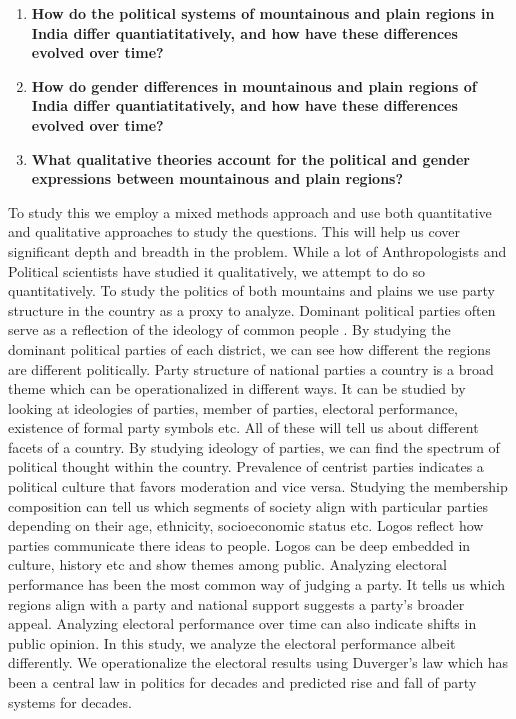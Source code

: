 \begin{sloppypar}
\begin{enumerate}
    \item \textbf{How do the political systems of mountainous and plain regions in India differ quantiatitatively, and how have these differences evolved over time? }
    \item \textbf{How do gender differences in mountainous and plain regions of India differ quantiatitatively, and how have these differences evolved over time?}
    \item \textbf{What qualitative theories account for the political and gender expressions between mountainous and plain regions?}
\end{enumerate}

To study this we employ a mixed methods approach and use both quantitative and qualitative approaches to study the questions. This will help us cover significant depth and breadth in the problem. While a lot of Anthropologists and Political scientists have studied it qualitatively, we attempt to do so quantitatively. To study the politics of both mountains and plains we use party structure in the country as a proxy to analyze. Dominant political parties often serve as a reflection of the ideology of common people \citep{romeijn2020political}. By studying the dominant political parties of each district, we can see how different the regions are different politically. Party structure of national parties a country is a broad theme which can be operationalized in different ways. It can be studied by looking at ideologies of parties, member of parties, electoral performance, existence of formal party symbols etc. All of these will tell us about different facets of a country. By studying ideology of parties, we can find the spectrum of political thought within the country. Prevalence of centrist parties indicates a political culture that favors moderation and vice versa. Studying the membership composition can tell us  which segments of society align with particular parties depending on their age, ethnicity, socioeconomic status etc. Logos reflect how parties communicate there ideas to people. Logos can be deep embedded in culture, history etc and show themes among public. Analyzing electoral performance has been the most common way of judging a party. It tells us which regions align with a party and national support suggests a party's broader appeal. Analyzing electoral performance over time can also indicate shifts in public opinion. In this study, we analyze the electoral performance albeit differently. We operationalize the electoral results using Duverger's law which has been a central law in politics for decades and predicted rise and fall of party systems for decades. 


\end{sloppypar}
